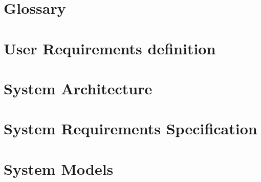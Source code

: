 \documentclass[letterpaper]{article}
\begin{document}
\section{Glossary}
\pagebreak

\section{User Requirements definition}
\pagebreak

\section{System Architecture}
\pagebreak

\section{System Requirements Specification}
\pagebreak

\section{System Models}
\pagebreak

\end{document}
